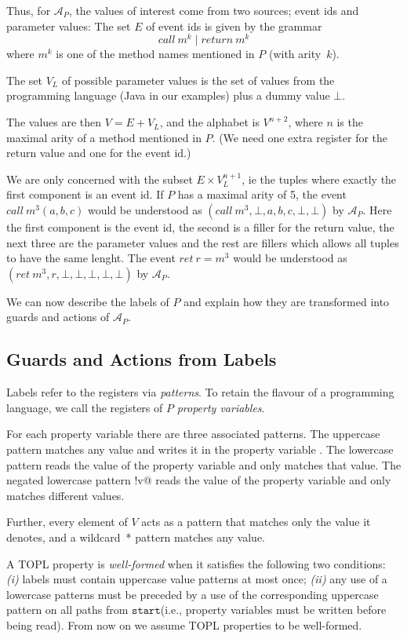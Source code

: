 \documentclass[9pt, preprint]{sigplanconf} %
\newcommand{\A}{\ensuremath{\mathcal{A}}}
\newcommand{\start}{\ensuremath{\mathtt{start}}\xspace}
\theoremstyle{definition}
\theoremstyle{remark}
\begin{document}
Thus, for $\A_P$, the values of interest come from two
sources; event ids and parameter values: The set $E$ of event ids is given by
the grammar
\[
call\ m^k \mid return\ m^k
\]
where $m^k$ is one of the method names mentioned in $P$ (with arity~$k$).

The set $V_L$ of possible parameter values is the set of values from
the programming language (Java in our examples)
plus a dummy value $\bot$.

The values are then $V = E + V_L$, and the alphabet is $V^{n+2}$,
where $n$ is the maximal arity of a method mentioned in $P$.
(We need one extra register for the return value and one for the event
id.)

We are only concerned with the subset $E \times V_L^{n+1}$, ie the
tuples where exactly the first component is an event
id. If $P$ has a maximal arity of 5, the event $call\ m^3(a, b, c)$
would be understood as $(call\ m^3, \bot,  a, b, c, \bot, \bot)$ by
$\A_P$. Here the first component is the event id, the second is a
filler for the return value, the next three are the parameter values and the rest are
fillers which allows all tuples to have the same lenght. The event $ret\ r = m^3$
would be understood as $(ret\ m^3, r, \bot, \bot, \bot, \bot, \bot)$ by
$\A_P$.

We can now describe the labels of $P$ and explain how they are transformed into guards and
actions of $\A_P$.

\subsection{Guards and Actions from Labels}

Labels refer to the registers via \emph{patterns}. To retain the
flavour of a programming language, we call the registers of $P$
\emph{property variables}.

For each property variable \Verb@v@ there are three associated patterns.
The uppercase pattern \Verb@V@ matches any value and writes it in the property variable \Verb@v@.
The lowercase pattern \Verb@v@ reads the value of the property variable \Verb@v@ and only matches that value.
The negated lowercase pattern \Verb@!v@ reads the value of the
property variable \Verb@v@ and only matches different values.

Further, every element of $V$ acts as a pattern that matches only the value it denotes,
and a wildcard~* pattern matches any value.

\smallskip
A TOPL property is \emph{well-formed} when it satisfies the following two conditions:
{\em (i)} labels must contain uppercase value patterns at most once; {\em (ii)}
any use of a lowercase patterns must be preceded by a use of the corresponding uppercase pattern on all paths from \start  (i.e., property variables must be written before being read).
From now on we assume TOPL properties to be well-formed.
\end{document}
